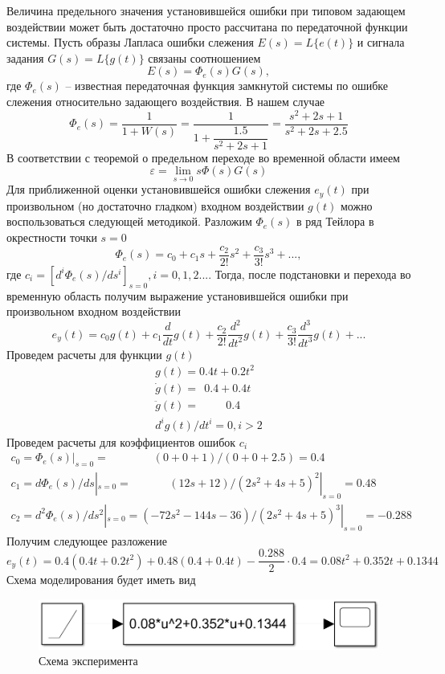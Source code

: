 \documentclass[a4paper, 12pt]{article}
\begin{document}
    Величина предельного значения установившейся ошибки при типовом
    задающем воздействии может быть достаточно просто рассчитана по передаточной функции
    системы. Пусть образы Лапласа ошибки слежения $E(s)=L\{e(t)\}$ и сигнала задания
    $G(s)=L\{g(t)\}$ связаны соотношением
    $$E(s)=\Phi_e(s)G(s),$$
    где $\Phi_e(s)$ -- известная передаточная функция замкнутой системы по ошибке слежения
    относительно задающего воздействия. В нашем случае
    $$\Phi_e(s)=\dfrac{1}{1+W(s)}=\dfrac{1}{1+\dfrac{1.5}{s^2+2s+1}}=\dfrac{s^2+2s+1}{s^2+2s+2.5}$$
    В соответствии с теоремой о предельном переходе во временной области имеем
    $$\varepsilon=\lim\limits_{s\rightarrow0}s\Phi(s)G(s)$$
    Для приближенной оценки установившейся ошибки слежения $e_y(t)$
    при произвольном (но достаточно гладком) входном воздействии $g(t)$ можно воспользоваться
    следующей методикой. Разложим $\Phi_e(s)$ в ряд Тейлора в окрестности точки $s=0$
    $$\Phi_e(s)=c_0+c_1s+\dfrac{c_2}{2!}s^2+\dfrac{c_3}{3!}s^3+...,$$
    где $c_i=\left[d^i\Phi_e(s)/ds^i\right]_{s=0},i=0,1,2...$. Тогда, после подстановки и
    перехода во временную область получим выражение установившейся ошибки при
    произвольном входном воздействии
    $$e_y(t)=c_0g(t)+c_1\dfrac{d}{dt}g(t)+\dfrac{c_2}{2!}\dfrac{d^2}{dt^2}g(t)+\dfrac{c_3}{3!}\dfrac{d^3}{dt^3}g(t)+...$$
    Проведем расчеты для функции $g(t)$
    $$
    \begin{matrix}
        g(t)=0.4t+0.2t^2\\
        \dot{g}(t)=\ \ 0.4+0.4t\\
        \ddot{g}(t)=\ \ \ \ \ \ \ \ \ \ \, 0.4\\
        d^ig(t)/dt^i=0,i>2
    \end{matrix}
    $$
    Проведем расчеты для коэффициентов ошибок $c_i$
    $$
    \begin{matrix}
        c_0=\Phi_e(s)|_{s=0}=\ \ \ \ \ \ \ \ \ \ \ \ \ \ \ \ \ \, (0+0+1)/(0+0+2.5)=0.4\\
        c_1=d\Phi_e(s)/ds|_{s=0}=\ \ \ \ \ \ \ \ \ \ \ \ \ \ \ (12s+12)/(2s^2+4s+5)^2|_{s=0}=0.48\\
        c_2=d^2\Phi_e(s)/ds^2|_{s=0}=(-72s^2-144s-36)/(2s^2+4s+5)^3|_{s=0}=-0.288
    \end{matrix}
    $$
    Получим следующее разложение
    $$e_y(t)=0.4(0.4t+0.2t^2)+0.48(0.4+0.4t)-\dfrac{0.288}{2}\cdot0.4=0.08t^2+0.352t+0.1344$$
    Схема моделирования будет иметь вид
    \begin{figure}[H]
        \centering
        \includegraphics[scale=0.6]{scheme4_2.png}
        \captionsetup{skip=0pt}
        \caption{Схема эксперимента}
        \label{fig:scheme4_2}
    \end{figure}
\end{document}
